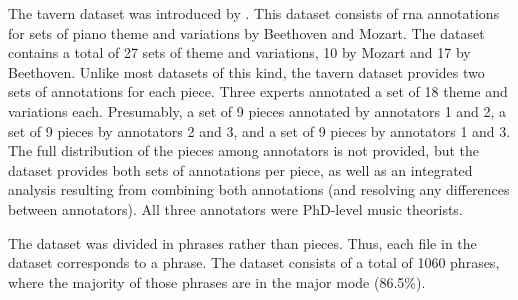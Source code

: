 

The \gls{tavern} dataset was introduced by
\textcite{devaney2015theme}. This dataset consists of
\gls{rna} annotations for sets of piano theme and variations
by Beethoven and Mozart. The dataset contains a total of 27
sets of theme and variations, 10 by Mozart and 17 by
Beethoven. Unlike most datasets of this kind, the
\gls{tavern} dataset provides two sets of annotations for
each piece. Three experts annotated a set of 18 theme and
variations each. Presumably, a set of 9 pieces annotated by
annotators 1 and 2, a set of 9 pieces by annotators 2 and 3,
and a set of 9 pieces by annotators 1 and 3. The full
distribution of the pieces among annotators is not provided,
but the dataset provides both sets of annotations per piece,
as well as an integrated analysis resulting from combining
both annotations (and resolving any differences between
annotators). All three annotators were PhD-level music
theorists.

The dataset was divided in phrases rather than pieces. Thus,
each file in the dataset corresponds to a phrase. The
dataset consists of a total of 1060 phrases, where the
majority of those phrases are in the major mode (86.5\%).